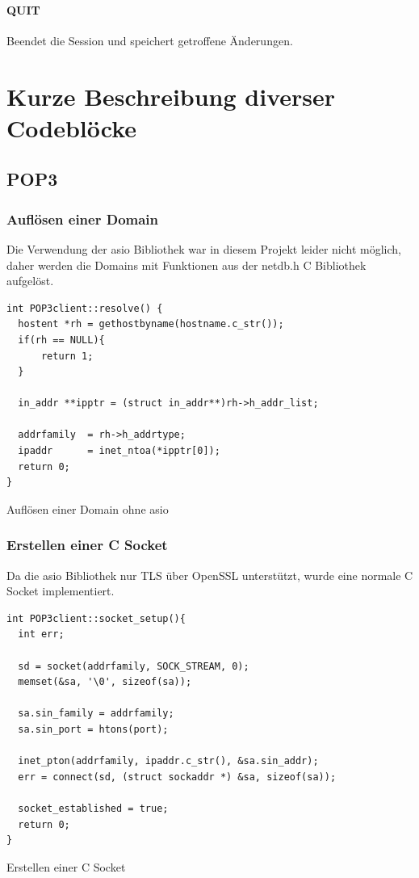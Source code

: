\documentclass[12pt, letterpaper]{article}
\newenvironment{code}{\captionsetup{type=listing}}{}
\begin{document}
\paragraph{QUIT}
Beendet die Session und speichert getroffene Änderungen.

\section{Kurze Beschreibung diverser Codeblöcke}

\subsection{POP3}

\subsubsection{Auflösen einer Domain}

Die Verwendung der asio Bibliothek war in diesem Projekt leider nicht möglich, daher werden die Domains mit Funktionen aus der netdb.h C Bibliothek aufgelöst.

\begin{code}
\begin{verbatim}
int POP3client::resolve() {
  hostent *rh = gethostbyname(hostname.c_str());
  if(rh == NULL){
      return 1;
  }

  in_addr **ipptr = (struct in_addr**)rh->h_addr_list;

  addrfamily  = rh->h_addrtype;
  ipaddr      = inet_ntoa(*ipptr[0]);
  return 0;
}
\end{verbatim}
\caption{Auflösen einer Domain ohne asio}
\label{resolve_domain}
\end{code}

\subsubsection{Erstellen einer C Socket}

Da die asio Bibliothek nur TLS über OpenSSL unterstützt, wurde eine normale C Socket implementiert. 

\begin{code}
\begin{verbatim}
int POP3client::socket_setup(){
  int err;

  sd = socket(addrfamily, SOCK_STREAM, 0);
  memset(&sa, '\0', sizeof(sa));

  sa.sin_family = addrfamily;
  sa.sin_port = htons(port);

  inet_pton(addrfamily, ipaddr.c_str(), &sa.sin_addr);
  err = connect(sd, (struct sockaddr *) &sa, sizeof(sa));

  socket_established = true;
  return 0;
}
\end{verbatim}
\caption{Erstellen einer C Socket}
\label{create_c_socket}
\end{code}
\end{document}
